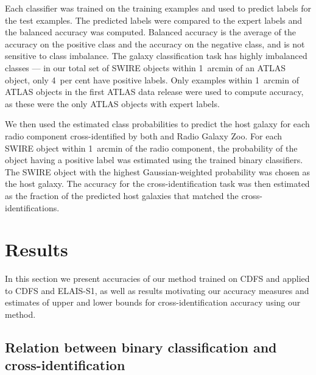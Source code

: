 \documentclass[fleqn,usenatbib,usedcolumn]{mnras}
\begin{document}
    Each classifier was trained on the training examples and used to predict
    labels for the test examples. The predicted labels were compared to the
    expert labels and the balanced accuracy was computed. Balanced accuracy is the average of the accuracy on the positive class and the accuracy on the negative class, and is not sensitive to class imbalance. The galaxy classification task has highly imbalanced classes --- in
    our total set of SWIRE objects within 1~arcmin of an ATLAS object, only
    4~per cent have positive labels.
    Only examples within 1~arcmin of ATLAS
    objects in the first ATLAS data release \citep{norris06} were used to
    compute accuracy, as these were the only ATLAS objects with expert labels.

    We then used the estimated class probabilities to predict the host galaxy for
    each radio component cross-identified by both \citet{norris06} and Radio
    Galaxy Zoo. For each SWIRE object within 1~arcmin of the radio component,
    the probability of the object having a positive label was estimated using
    the trained binary classifiers. The SWIRE object with the highest Gaussian-weighted
    probability was chosen as the host galaxy. The accuracy for the cross-identification task was then estimated
    as the fraction of the predicted host galaxies that matched the \citet{norris06} cross-identifications.

\section{Results}\label{sec:results}

  In this section we present accuracies of our method trained on CDFS and
  applied to CDFS and ELAIS-S1, as well as results motivating our accuracy
  measures and estimates of upper and lower
  bounds for cross-identification accuracy using our method.

  \subsection{Relation between binary classification and cross-identification}
  \label{sec:relation}
\end{document}
